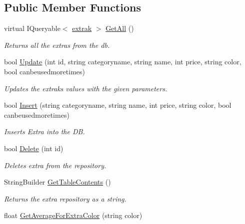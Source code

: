 \subsection*{Public Member Functions}
\begin{DoxyCompactItemize}
\item 
virtual I\+Queryable$<$ \mbox{\hyperlink{class_car_shop_1_1_data_1_1extrak}{extrak}} $>$ \mbox{\hyperlink{class_car_shop_1_1_repository_1_1_extra_repository_a0a92d950f546db179a19d08e0dc4a1c5}{Get\+All}} ()
\begin{DoxyCompactList}\small\item\em Returns all the extras from the db. \end{DoxyCompactList}\item 
bool \mbox{\hyperlink{class_car_shop_1_1_repository_1_1_extra_repository_a9d9b595b2641d3eb6674979c1aded4a2}{Update}} (int id, string categoryname, string name, int price, string color, bool canbeusedmoretimes)
\begin{DoxyCompactList}\small\item\em Updates the extrak\textquotesingle{}s values with the given parameters. \end{DoxyCompactList}\item 
bool \mbox{\hyperlink{class_car_shop_1_1_repository_1_1_extra_repository_a52a8367258e2eb413f8160a040c6ac61}{Insert}} (string categoryname, string name, int price, string color, bool canbeusedmoretimes)
\begin{DoxyCompactList}\small\item\em Inserts Extra into the DB. \end{DoxyCompactList}\item 
bool \mbox{\hyperlink{class_car_shop_1_1_repository_1_1_extra_repository_ac89e3ff578a01c619c5767a2f10e45fb}{Delete}} (int id)
\begin{DoxyCompactList}\small\item\em Deletes extra from the repository. \end{DoxyCompactList}\item 
String\+Builder \mbox{\hyperlink{class_car_shop_1_1_repository_1_1_extra_repository_af2f4e893243faab043677e5df69b822d}{Get\+Table\+Contents}} ()
\begin{DoxyCompactList}\small\item\em Returns the extra repository as a string. \end{DoxyCompactList}\item 
float \mbox{\hyperlink{class_car_shop_1_1_repository_1_1_extra_repository_aaaed7529b9267af203071a9f22d00b44}{Get\+Average\+For\+Extra\+Color}} (string color)

\end{DoxyCompactItemize}
